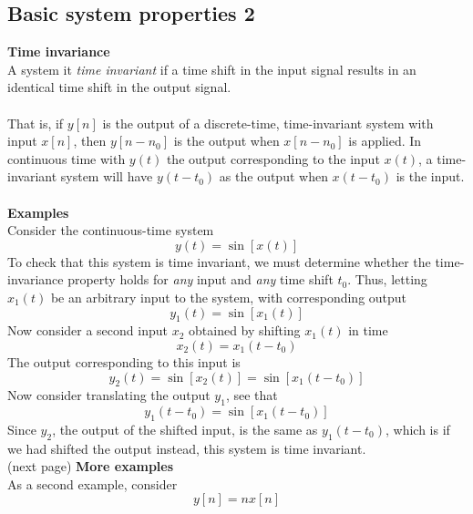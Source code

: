 \documentclass{report}
\begin{document}
\subsection{Basic system properties 2}
\textbf{Time invariance}\\
A system it \textit{time invariant} if a time shift in the input signal results in an identical time shift in the output
signal.\\
\vspace{1mm}\\
That is, if $y[n]$ is the output of a discrete-time, time-invariant system with input $x[n]$, then $y[n-n_0]$ is the output
when $x[n-n_0]$ is applied. In continuous time with $y(t)$ the output corresponding to the input $x(t)$, a time-invariant system
will have $y(t-t_0)$ as the output when $x(t-t_0)$ is the input.\\
\vspace{1mm}\\
\textbf{Examples}\\
Consider the continuous-time system
\begin{equation*}
y(t)=\sin[x(t)]
\end{equation*}
To check that this system is time invariant, we must determine whether the time-invariance property holds for \textit{any} input
and \textit{any} time shift $t_0$. Thus, letting $x_1(t)$ be an
arbitrary input to the system, with corresponding output
\begin{equation*}
y_1(t)=\sin[x_1(t)]
\end{equation*}
Now consider a second input $x_2$ obtained by shifting $x_1(t)$ in time
\begin{equation*}
x_2(t)=x_1(t-t_0)
\end{equation*}
The output corresponding to this input is
\begin{equation*}
y_2(t)=\sin[x_2(t)]=\sin[x_1(t-t_0)]
\end{equation*}
Now consider translating the output $y_1$, see that
\begin{equation*}
y_1(t-t_0)=\sin[x_1(t-t_0)]
\end{equation*}
Since $y_2$, the output of the shifted input, is the same as $y_1(t-t_0)$, which is if we had shifted the output instead, this
system is time invariant.\\
(next page)\newpage
\noindent\textbf{More examples}\\
As a second example, consider
\begin{equation*}
y[n]=nx[n]
\end{equation*}
\end{document}
